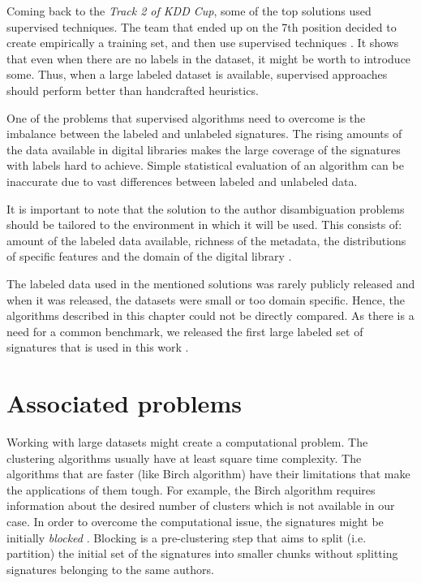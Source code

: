 \documentclass{pracamgr}
\begin{document}
Coming back to the \textit{Track 2 of KDD Cup}, some of the top solutions used supervised
techniques. The team that ended up on the 7th position decided to create empirically a training
set, and then use supervised techniques \citep{Zhao:2013}. It shows that even when there are no
labels in the dataset, it might be worth to introduce some. Thus, when a large labeled dataset
is available, supervised approaches should perform better than handcrafted heuristics.

One of the problems that supervised algorithms need to overcome is the imbalance between the 
labeled and unlabeled signatures. The rising amounts of the data available in digital 
libraries makes the large coverage of the signatures with labels hard to achieve. Simple 
statistical evaluation of an algorithm can be inaccurate due to vast differences between labeled 
and unlabeled data.

It is important to note that the solution to the author disambiguation problems should be tailored 
to the environment in which it will be used. This consists of: amount of the labeled data available, 
richness of the metadata, the distributions of specific features and the domain of the digital 
library \citep{santana2014combining}.

The labeled data used in the mentioned solutions was rarely publicly released and when it was
released, the datasets were small or too domain specific. Hence, the algorithms 
described in this chapter could not be directly compared. As there is a need for a common
benchmark, we released the first large labeled set of signatures that is used in this
work \citep{Louppe}.

\section{Associated problems}

Working with large datasets might create a computational problem. The clustering
algorithms usually have at least square time complexity. The algorithms that are faster
(like Birch algorithm) have their limitations that make the applications of them
tough. For example, the Birch algorithm requires information about the desired number
of clusters which is not available in our case. In order to overcome the computational issue, the
signatures might be initially \textit{blocked} \citep{On}. Blocking is a pre-clustering
step that aims to split (i.e. partition) the initial set of the signatures into smaller 
chunks without splitting signatures belonging to the same authors.
\end{document}
